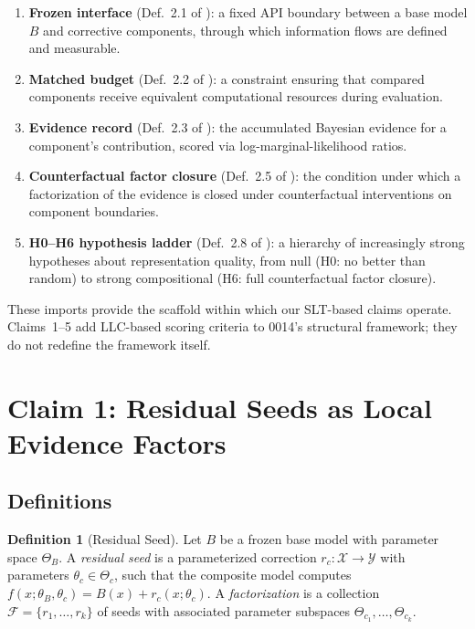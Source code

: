 \documentclass[11pt,a4paper]{article}
\theoremstyle{definition}
\newtheorem{definition}[theorem]{Definition}
\theoremstyle{remark}
\newcommand{\cF}{\mathcal{F}}
\newcommand{\cX}{\mathcal{X}}
\newcommand{\cY}{\mathcal{Y}}
\begin{document}
\begin{enumerate}[label=(\roman*),leftmargin=2em]
  \item \textbf{Frozen interface} (Def.~2.1 of \cite{CausalFibres}): a fixed
    API boundary between a base model $B$ and corrective components, through
    which information flows are defined and measurable.
  \item \textbf{Matched budget} (Def.~2.2 of \cite{CausalFibres}): a
    constraint ensuring that compared components receive equivalent
    computational resources during evaluation.
  \item \textbf{Evidence record} (Def.~2.3 of \cite{CausalFibres}): the
    accumulated Bayesian evidence for a component's contribution, scored via
    log-marginal-likelihood ratios.
  \item \textbf{Counterfactual factor closure} (Def.~2.5 of
    \cite{CausalFibres}): the condition under which a factorization of the
    evidence is closed under counterfactual interventions on component
    boundaries.
  \item \textbf{H0--H6 hypothesis ladder} (Def.~2.8 of \cite{CausalFibres}):
    a hierarchy of increasingly strong hypotheses about representation quality,
    from null (H0: no better than random) to strong compositional (H6: full
    counterfactual factor closure).
\end{enumerate}

\noindent
These imports provide the scaffold within which our SLT-based claims operate.
Claims~1--5 add LLC-based scoring criteria to 0014's structural framework; they
do not redefine the framework itself.

\section{Claim 1: Residual Seeds as Local Evidence Factors}\label{sec:claim1}

\subsection{Definitions}

\begin{definition}[Residual Seed]\label{def:seed}
  Let $B$ be a frozen base model with parameter space $\Theta_B$.  A
  \emph{residual seed} is a parameterized correction $r_c : \cX \to \cY$ with
  parameters $\theta_c \in \Theta_c$, such that the composite model computes
  $f(x;\theta_B,\theta_c) = B(x) + r_c(x;\theta_c)$.  A \emph{factorization}
  is a collection $\cF = \{r_1, \ldots, r_k\}$ of seeds with associated
  parameter subspaces $\Theta_{c_1}, \ldots, \Theta_{c_k}$.
\end{definition}
\end{document}
